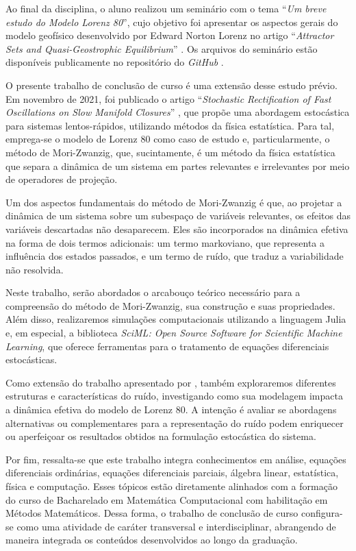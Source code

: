 \documentclass[12pt]{article}
\begin{document}
    Ao final da disciplina, o aluno realizou um seminário com o tema ``\textit{Um breve estudo do Modelo Lorenz 80}'', cujo objetivo foi apresentar os aspectos gerais do modelo geofísico desenvolvido por Edward Norton Lorenz no artigo ``\textit{Attractor Sets and Quasi-Geostrophic Equilibrium}'' \citep{Lorenz1980}. Os arquivos do seminário estão disponíveis publicamente no repositório do \textit{GitHub} \citep{TaylorL80}.
    
    O presente trabalho de conclusão de curso é uma extensão desse estudo prévio. Em novembro de 2021, foi publicado o artigo ``\textit{Stochastic Rectification of Fast Oscillations on Slow Manifold Closures}'' \citep{Chekroun2021}, que propõe uma abordagem estocástica para sistemas lentos-rápidos, utilizando métodos da física estatística. Para tal, emprega-se o modelo de Lorenz 80 como caso de estudo e, particularmente, o método de Mori-Zwanzig, que, sucintamente, é um método da física estatística que separa a dinâmica de um sistema em partes relevantes e irrelevantes por meio de operadores de projeção.
    
    Um dos aspectos fundamentais do método de Mori-Zwanzig é que, ao projetar a dinâmica de um sistema sobre um subespaço de variáveis relevantes, os efeitos das variáveis descartadas não desaparecem. Eles são incorporados na dinâmica efetiva na forma de dois termos adicionais: um termo markoviano, que representa a influência dos estados passados, e um termo de ruído, que traduz a variabilidade não resolvida. 
    
    Neste trabalho, serão abordados o arcabouço teórico necessário para a compreensão do método de Mori-Zwanzig, sua construção e suas propriedades. Além disso, realizaremos simulações computacionais utilizando a linguagem Julia e, em especial, a biblioteca \textit{SciML: Open Source Software for Scientific Machine Learning}, que oferece ferramentas para o tratamento de equações diferenciais estocásticas. 
    
    Como extensão do trabalho apresentado por \citet{Chekroun2021}, também exploraremos diferentes estruturas e características do ruído, investigando como sua modelagem impacta a dinâmica efetiva do modelo de Lorenz 80. A intenção é avaliar se abordagens alternativas ou complementares para a representação do ruído podem enriquecer ou aperfeiçoar os resultados obtidos na formulação estocástica do sistema.
    
    Por fim, ressalta-se que este trabalho integra conhecimentos em análise, equações diferenciais ordinárias, equações diferenciais parciais, álgebra linear, estatística, física e computação. Esses tópicos estão diretamente alinhados com a formação do curso de Bacharelado em Matemática Computacional com habilitação em Métodos Matemáticos. Dessa forma, o trabalho de conclusão de curso configura-se como uma atividade de caráter transversal e interdisciplinar, abrangendo de maneira integrada os conteúdos desenvolvidos ao longo da graduação.
    
\end{document}
